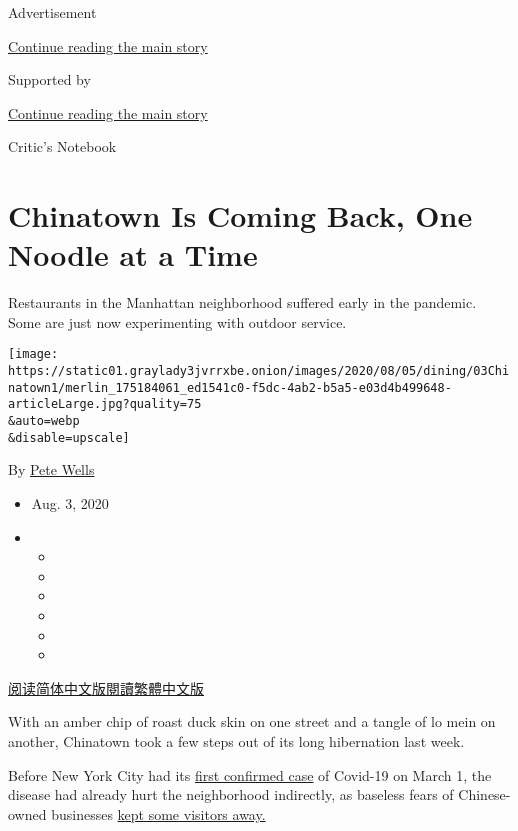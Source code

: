 Advertisement

\protect\hyperlink{after-top}{Continue reading the main story}

Supported by

\protect\hyperlink{after-sponsor}{Continue reading the main story}

Critic's Notebook

\hypertarget{chinatown-is-coming-back-one-noodle-at-a-time}{%
\section{Chinatown Is Coming Back, One Noodle at a
Time}\label{chinatown-is-coming-back-one-noodle-at-a-time}}

Restaurants in the Manhattan neighborhood suffered early in the
pandemic. Some are just now experimenting with outdoor service.

\texttt{[image: https://static01.graylady3jvrrxbe.onion/images/2020/08/05/dining/03Chinatown1/merlin\_175184061\_ed1541c0-f5dc-4ab2-b5a5-e03d4b499648-articleLarge.jpg?quality=75\\\&auto=webp\\\&disable=upscale]}

By \href{https://www.nytimes3xbfgragh.onion/by/pete-wells}{Pete Wells}

\begin{itemize}
\item
  Aug. 3, 2020
\item
  \begin{itemize}
  \item
  \item
  \item
  \item
  \item
  \item
  \end{itemize}
\end{itemize}

\href{https://cn.nytimes3xbfgragh.onion/style/20200804/chinatown-outdoor-dining-coronavirus/}{阅读简体中文版}\href{https://cn.nytimes3xbfgragh.onion/style/20200804/chinatown-outdoor-dining-coronavirus/zh-hant/}{閱讀繁體中文版}

With an amber chip of roast duck skin on one street and a tangle of lo
mein on another, Chinatown took a few steps out of its long hibernation
last week.

Before New York City had its
\href{https://www.nytimes3xbfgragh.onion/2020/03/01/nyregion/new-york-coronvirus-confirmed.html}{first
confirmed case} of Covid-19 on March 1, the disease had already hurt the
neighborhood indirectly, as baseless fears of Chinese-owned businesses
\href{https://www.nytimes3xbfgragh.onion/2020/01/29/nyregion/coronavirus-nyc.html}{kept
some visitors away.}

